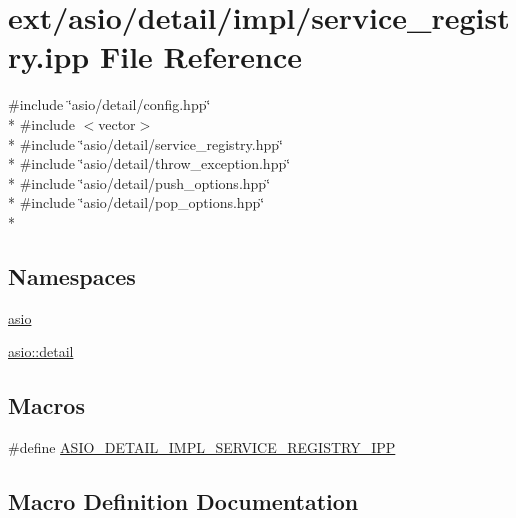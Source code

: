 \hypertarget{service__registry_8ipp}{}\section{ext/asio/detail/impl/service\+\_\+registry.ipp File Reference}
\label{service__registry_8ipp}
{\ttfamily \#include \char`\"{}asio/detail/config.\+hpp\char`\"{}}\\*
{\ttfamily \#include $<$vector$>$}\\*
{\ttfamily \#include \char`\"{}asio/detail/service\+\_\+registry.\+hpp\char`\"{}}\\*
{\ttfamily \#include \char`\"{}asio/detail/throw\+\_\+exception.\+hpp\char`\"{}}\\*
{\ttfamily \#include \char`\"{}asio/detail/push\+\_\+options.\+hpp\char`\"{}}\\*
{\ttfamily \#include \char`\"{}asio/detail/pop\+\_\+options.\+hpp\char`\"{}}\\*
\subsection*{Namespaces}
\begin{DoxyCompactItemize}
\item 
 \hyperlink{namespaceasio}{asio}
\item 
 \hyperlink{namespaceasio_1_1detail}{asio\+::detail}
\end{DoxyCompactItemize}
\subsection*{Macros}
\begin{DoxyCompactItemize}
\item 
\#define \hyperlink{service__registry_8ipp_ac7e8816b5f2ab5ff49d95aa2fb6c89d8}{A\+S\+I\+O\+\_\+\+D\+E\+T\+A\+I\+L\+\_\+\+I\+M\+P\+L\+\_\+\+S\+E\+R\+V\+I\+C\+E\+\_\+\+R\+E\+G\+I\+S\+T\+R\+Y\+\_\+\+I\+P\+P}
\end{DoxyCompactItemize}


\subsection{Macro Definition Documentation}
\hypertarget{service__registry_8ipp_ac7e8816b5f2ab5ff49d95aa2fb6c89d8}{}
